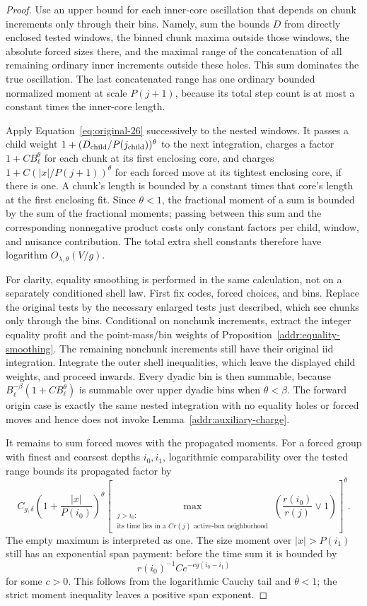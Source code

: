 \begin{proof}
Use an upper bound for each inner-core oscillation that depends on
chunk increments only through their bins.  Namely, sum the bounds
$D$ from directly enclosed tested windows, the binned chunk maxima
outside those windows, the absolute forced sizes there, and the
maximal range of the concatenation of all remaining ordinary inner
increments outside these holes.  This sum dominates the true
oscillation.  The last concatenated range has one ordinary bounded
normalized moment at scale $P(j+1)$, because its total step
count is at most a constant times the inner-core length.

Apply Equation~\eqref{eq:original-26} successively to the nested
windows.  It passes a child weight
$1+(D_{\rm child}/P(j_{\rm child}))^\theta$ to the next
integration, charges a factor $1+CB_\ell^\theta$ for each chunk
at its first enclosing core, and charges
$1+C(|x|/P(j+1))^\theta$ for each forced move at its tightest
enclosing core, if there is one.  A chunk's length is bounded by a
constant times that core's length at the first enclosing fit.
Since $\theta<1$, the fractional moment of a sum is bounded by
the sum of the fractional moments; passing between this sum and
the corresponding nonnegative product costs only constant factors
per child, window, and nuisance contribution.  The total extra
shell constants therefore have logarithm
$O_{\lambda,\theta}(V/g)$.

For clarity, equality smoothing is performed in the same
calculation, not on a separately conditioned shell law.  First fix
codes, forced choices, and bins.  Replace the original tests by
the necessary enlarged tests just described, which see chunks only
through the bins.  Conditional on nonchunk increments, extract the
integer equality profit and the point-mass/bin weights of
Proposition~\ref{addr:equality-smoothing}.  The remaining
nonchunk increments still have their original iid integration.
Integrate the outer shell inequalities, which leave the displayed
child weights, and proceed inwards.  Every dyadic bin is then
summable, because
$B_\ell^{-\beta}(1+CB_\ell^\theta)$ is summable over upper
dyadic bins when $\theta<\beta$.  The forward origin case is
exactly the same nested integration with no equality holes or
forced moves and hence does not invoke
Lemma~\ref{addr:auxiliary-charge}.

It remains to sum forced moves with the propagated moments.
For a forced group with finest and coarsest depths $i_0,i_1$,
logarithmic comparability over the tested range bounds its propagated
factor by
\[
 C_{g,\delta}\left(1+\frac{|x|}{P(i_0)}\right)^\theta
 \left[
 \max_{\substack{j>i_0:\\
        \text{its time lies in a }Cr(j)\text{ active-box neighborhood}}}
        \left(\frac{r(i_0)}{r(j)}\vee1\right)
 \right]^\theta.
\]
The empty maximum is interpreted as one.  The size moment over
$|x|>P(i_1)$ still has an exponential span payment: before the
time sum it is bounded by
\[
                 r(i_0)^{-1}C e^{-cg(i_0-i_1)}
\]
for some $c>0$.  This follows from the logarithmic Cauchy tail
and $\theta<1$; the strict moment inequality leaves a positive
span exponent.


\end{proof}
